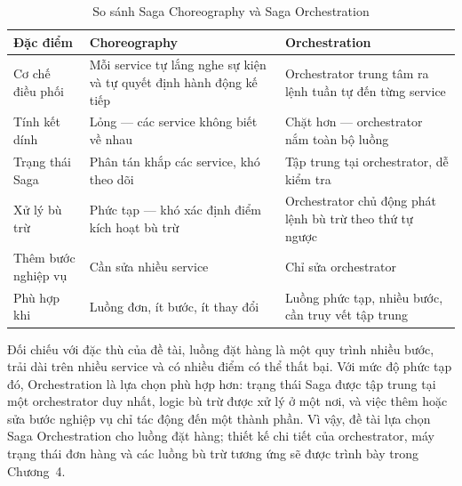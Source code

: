 \documentclass[../DoAn.tex]{subfiles}
\begin{document}
\begin{table}[H]
\centering
\caption{So sánh Saga Choreography và Saga Orchestration}
\label{table:saga-comparison}
\begin{compacttable}
\begin{tabularx}{\textwidth}{|L{2.8cm}|Y|Y|}
\hline
\textbf{Đặc điểm} & \textbf{Choreography} & \textbf{Orchestration} \\ \hline
Cơ chế điều phối  & Mỗi service tự lắng nghe sự kiện và tự quyết định hành động kế tiếp & Orchestrator trung tâm ra lệnh tuần tự đến từng service \\ \hline
Tính kết dính     & Lỏng --- các service không biết về nhau & Chặt hơn --- orchestrator nắm toàn bộ luồng \\ \hline
Trạng thái Saga   & Phân tán khắp các service, khó theo dõi & Tập trung tại orchestrator, dễ kiểm tra \\ \hline
Xử lý bù trừ     & Phức tạp --- khó xác định điểm kích hoạt bù trừ & Orchestrator chủ động phát lệnh bù trừ theo thứ tự ngược \\ \hline
Thêm bước nghiệp vụ & Cần sửa nhiều service & Chỉ sửa orchestrator \\ \hline
Phù hợp khi       & Luồng đơn, ít bước, ít thay đổi & Luồng phức tạp, nhiều bước, cần truy vết tập trung \\ \hline
\end{tabularx}
\end{compacttable}
\end{table}

Đối chiếu với đặc thù của đề tài, luồng đặt hàng là một quy trình nhiều bước, trải dài trên
nhiều service và có nhiều điểm có thể thất bại. Với mức độ phức tạp đó, Orchestration là lựa
chọn phù hợp hơn: trạng thái Saga được tập trung tại một orchestrator duy nhất, logic bù trừ
được xử lý ở một nơi, và việc thêm hoặc sửa bước nghiệp vụ chỉ tác động đến một thành phần.
Vì vậy, đề tài lựa chọn Saga Orchestration cho luồng đặt hàng; thiết kế chi tiết của
orchestrator, máy trạng thái đơn hàng và các luồng bù trừ tương ứng sẽ được trình bày trong
Chương~4.

\end{document}

